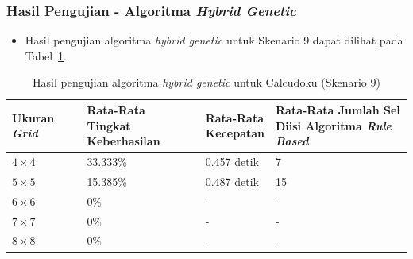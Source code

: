\documentclass{beamer}
\begin{document}
\begin{frame}
\frametitle{Hasil Pengujian - Algoritma \textit{Hybrid Genetic}}
\begin{itemize}
\item Hasil pengujian algoritma \textit{hybrid genetic} untuk Skenario 9 dapat dilihat pada Tabel~\ref{tab:pengujianhg9}.
\end{itemize}
\begin{table}
\tiny
\centering
\captionsetup{justification=centering}
\caption[Hasil pengujian algoritma \textit{hybrid genetic} untuk Calcudoku (Skenario 9)]{Hasil pengujian algoritma \textit{hybrid genetic} untuk Calcudoku (Skenario 9)}
\begin{tabular}{| l | l | l | l |}
\hline
Ukuran \textit{Grid} & \makecell[c]{Rata-Rata \\ Tingkat Keberhasilan} & \makecell[c]{Rata-Rata \\ Kecepatan} & \makecell[c]{Rata-Rata Jumlah Sel \\ Diisi Algoritma \textit{Rule Based}} \\
\hline \hline
\begin{math}4 \times 4\end{math} & 33.333\% & 0.457 detik & 7 \\
\hline
\begin{math}5 \times 5\end{math} & 15.385\% & 0.487 detik & 15 \\
\hline
\begin{math}6 \times 6\end{math} & 0\% & - & - \\
\hline
\begin{math}7 \times 7\end{math} & 0\% & - & - \\
\hline
\begin{math}8 \times 8\end{math} & 0\% & - & - \\
\hline
\end{tabular}
\label{tab:pengujianhg9}
\end{table}
\end{frame}

\end{document}

